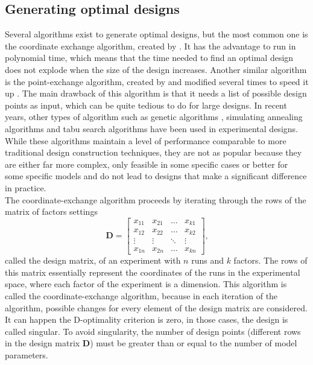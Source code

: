 \subsection{Generating optimal designs}
Several algorithms exist to generate optimal designs, but the most common one is 
the coordinate exchange algorithm, created by \textcite{meyer_coordinate-exchange_1995}. 
It has the advantage to run in polynomial time, which means that the time needed to find an optimal design does not explode when 
the size of the design increases. 
Another similar algorithm is the point-exchange algorithm, created by \textcite{fedorov_theory_1972} and modified several times to speed 
it up \parencite{johnson_guidelines_1983,atkinson_construction_1989}. The main drawback of this algorithm is that it needs a list of 
possible design points as input, which can be quite tedious to do for large designs. In recent years, other types of algorithm 
such as genetic algorithms \parencite{heredia-langner_genetic_2003,heredia-langner_model-robust_2004}, simulating annealing algorithms 
\parencite{bohachevsky_generalized_1986,meyer_constructing_1988} and tabu search algorithms \parencite{jung_construction_1996} have 
been used in experimental designs. While these algorithms maintain a level of performance comparable to more traditional design 
construction techniques, they are not as popular because they are either far more complex, only feasible in some specific cases 
or better for some specific models and do not lead to designs that make a significant difference in practice.\\

The coordinate-exchange algorithm proceeds by iterating through the rows of the matrix of factors settings
\begin{equation}
\mathbf{D}= 
    \begin{bmatrix}
        x_{11} & x_{21} & \ldots & x_{k1} \\
        x_{12} & x_{22} & \ldots & x_{k2} \\
        \vdots & \vdots & \ddots & \vdots \\
        x_{1n} & x_{2n} & \ldots & x_{kn} 
    \end{bmatrix}
    \text{,}
    \label{mat:design_matrix}
\end{equation}
called the design matrix, of an experiment with $n$ runs and $k$ factors. The rows of this matrix essentially represent the 
coordinates of the runs in the experimental space, where each factor of the experiment is a dimension. This algorithm is called 
the coordinate-exchange algorithm, because in each iteration of the algorithm, possible changes for every element of the design 
matrix are considered. \\
It can happen 
the D-optimality criterion is zero, in those cases, the design is called singular.
To avoid singularity, the number of design points (different rows in the design matrix $
\mathbf{D}$) must be greater than or equal to the number of model parameters.\\

